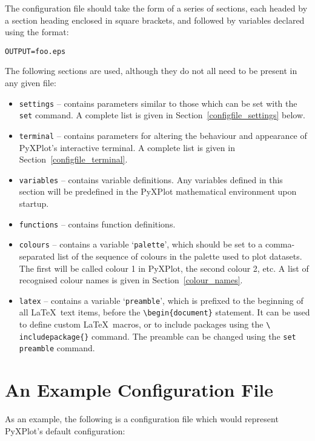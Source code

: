 The configuration file should take the form of a series of sections, each
headed by a section heading enclosed in square brackets, and followed by
variables declared using the format:

\begin{verbatim} 
OUTPUT=foo.eps
\end{verbatim}

The following sections are used, although they do not all need to be present in
any given file:

\begin{itemize}
\item {\tt settings} -- contains parameters similar to those which can be set with the {\tt set} command. A complete list is given in Section~\ref{configfile_settings} below.
\item {\tt terminal} -- contains parameters for altering the behaviour and appearance of PyXPlot's interactive terminal. A complete list is given in Section~\ref{configfile_terminal}.
\item {\tt variables} -- contains variable definitions. Any variables defined in this section will be predefined in the PyXPlot mathematical environment upon startup.
\item {\tt functions} -- contains function definitions.
\item {\tt colours} -- contains a variable `{\tt palette}', which should be set to a comma-separated list of the sequence of colours in the palette used to plot datasets. The first will be called colour 1 in PyXPlot, the second colour 2, etc. A list of recognised colour names is given in Section~\ref{colour_names}.
\item {\tt latex} -- contains a variable `{\tt preamble}', which is
prefixed to the beginning of all \LaTeX\ text items, before the
{\tt \textbackslash begin\{document\}} statement. It can be used to define
custom \LaTeX\ macros, or to include packages using the {\tt \textbackslash
includepackage\{\}} command.  The preamble can be changed using the {\tt set
preamble} command.
\end{itemize}

\section{An Example Configuration File}
\noindent As an example, the following is a configuration file
which would represent PyXPlot's default configuration:

